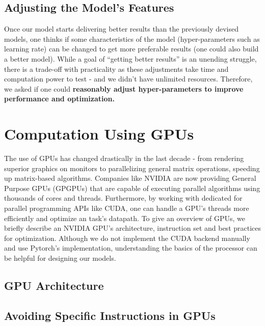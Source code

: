 \subsection{Adjusting the Model's Features} \label{sec:Important Questions - Adjusting the Model's Features}
Once our model starts delivering better results than the previously devised models, one thinks if some characteristics of the model (hyper-parameters such as learning rate) can be changed to get more preferable results (one could also build a better model). While a goal of ``getting better results'' is an unending struggle, there is a trade-off with practicality as these adjustments take time and computation power to test - and we didn't have unlimited resources. Therefore, we asked if one could \textbf{reasonably adjust hyper-parameters to improve performance and optimization.}

\section{Computation Using GPUs} \label{sec:Computation Using GPUs}
The use of GPUs has changed drastically in the last decade - from rendering superior graphics on monitors to parallelizing general matrix operations, speeding up matrix-based algorithms. Companies like NVIDIA are now providing General Purpose GPUs (GPGPUs) that are capable of executing parallel algorithms using thousands of cores and threads. Furthermore, by working with dedicated for parallel programming APIs like CUDA, one can handle a GPU's threads more efficiently and optimize an task's datapath. To give an overview of GPUs, we briefly describe an NVIDIA GPU's architecture, instruction set and best practices for optimization. Although we do not implement the CUDA backend manually and use Pytorch's implementation, understanding the basics of the processor can be helpful for designing our models.

\subsection{GPU Architecture}


\subsection{Avoiding Specific Instructions in GPUs}
